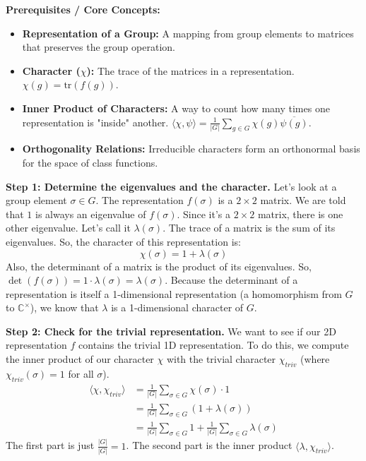 \begin{solution}
\textbf{Prerequisites / Core Concepts:}
\begin{itemize}
    \item \textbf{Representation of a Group:} A mapping from group elements to matrices that preserves the group operation.
    \item \textbf{Character ($\chi$):} The trace of the matrices in a representation. $\chi(g) = \text{tr}(f(g))$.
    \item \textbf{Inner Product of Characters:} A way to count how many times one representation is "inside" another. $\langle \chi, \psi \rangle = \frac{1}{|G|} \sum_{g \in G} \chi(g) \overline{\psi(g)}$.
    \item \textbf{Orthogonality Relations:} Irreducible characters form an orthonormal basis for the space of class functions.
\end{itemize}

\textbf{Step 1: Determine the eigenvalues and the character.}
Let's look at a group element $\sigma \in G$. The representation $f(\sigma)$ is a $2 \times 2$ matrix. We are told that $1$ is always an eigenvalue of $f(\sigma)$.
Since it's a $2 \times 2$ matrix, there is one other eigenvalue. Let's call it $\lambda(\sigma)$.
The trace of a matrix is the sum of its eigenvalues. So, the character of this representation is:
\[ \chi(\sigma) = 1 + \lambda(\sigma) \]
Also, the determinant of a matrix is the product of its eigenvalues. So, $\det(f(\sigma)) = 1 \cdot \lambda(\sigma) = \lambda(\sigma)$.
Because the determinant of a representation is itself a 1-dimensional representation (a homomorphism from $G$ to $\mathbb{C}^\times$), we know that $\lambda$ is a 1-dimensional character of $G$.

\textbf{Step 2: Check for the trivial representation.}
We want to see if our 2D representation $f$ contains the trivial 1D representation. To do this, we compute the inner product of our character $\chi$ with the trivial character $\chi_{triv}$ (where $\chi_{triv}(\sigma) = 1$ for all $\sigma$).
\begin{align*}
\langle \chi, \chi_{triv} \rangle &= \frac{1}{|G|} \sum_{\sigma \in G} \chi(\sigma) \cdot 1 \\
&= \frac{1}{|G|} \sum_{\sigma \in G} (1 + \lambda(\sigma)) \\
&= \frac{1}{|G|} \sum_{\sigma \in G} 1 + \frac{1}{|G|} \sum_{\sigma \in G} \lambda(\sigma)
\end{align*}
The first part is just $\frac{|G|}{|G|} = 1$. The second part is the inner product $\langle \lambda, \chi_{triv} \rangle$.


\end{solution}
